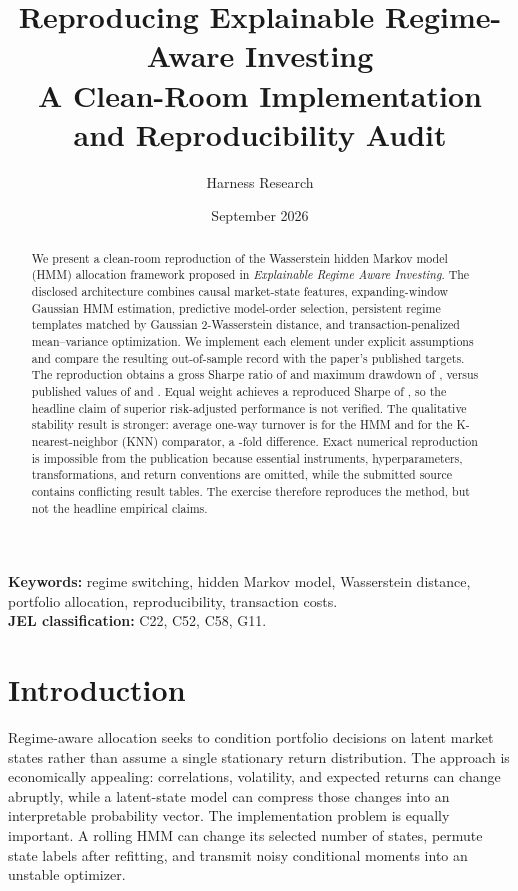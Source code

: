 \documentclass[11pt]{article}
\title{\textbf{Reproducing Explainable Regime-Aware Investing}\\
\large A Clean-Room Implementation and Reproducibility Audit}
\author{Harness Research}
\date{September 2026}
\begin{document}
\maketitle

\begin{abstract}
We present a clean-room reproduction of the Wasserstein hidden Markov model (HMM) allocation framework proposed in \emph{Explainable Regime Aware Investing}. The disclosed architecture combines causal market-state features, expanding-window Gaussian HMM estimation, predictive model-order selection, persistent regime templates matched by Gaussian 2-Wasserstein distance, and transaction-penalized mean--variance optimization. We implement each element under explicit assumptions and compare the resulting out-of-sample record with the paper's published targets. The reproduction obtains a gross Sharpe ratio of \RepHMMSharpe{} and maximum drawdown of \RepHMMMaxDD{}, versus published values of \PubHMMSharpe{} and \PubHMMMaxDD{}. Equal weight achieves a reproduced Sharpe of \RepEqualSharpe{}, so the headline claim of superior risk-adjusted performance is not verified. The qualitative stability result is stronger: average one-way turnover is \RepHMMTurnover{} for the HMM and \RepKNNTurnover{} for the K-nearest-neighbor (KNN) comparator, a \TurnoverRatio{}-fold difference. Exact numerical reproduction is impossible from the publication because essential instruments, hyperparameters, transformations, and return conventions are omitted, while the submitted source contains conflicting result tables. The exercise therefore reproduces the method, but not the headline empirical claims.
\end{abstract}

\noindent\textbf{Keywords:} regime switching, hidden Markov model, Wasserstein distance, portfolio allocation, reproducibility, transaction costs.\\
\textbf{JEL classification:} C22, C52, C58, G11.

\section{Introduction}

Regime-aware allocation seeks to condition portfolio decisions on latent market states rather than assume a single stationary return distribution. The approach is economically appealing: correlations, volatility, and expected returns can change abruptly, while a latent-state model can compress those changes into an interpretable probability vector. The implementation problem is equally important. A rolling HMM can change its selected number of states, permute state labels after refitting, and transmit noisy conditional moments into an unstable optimizer.
\end{document}
